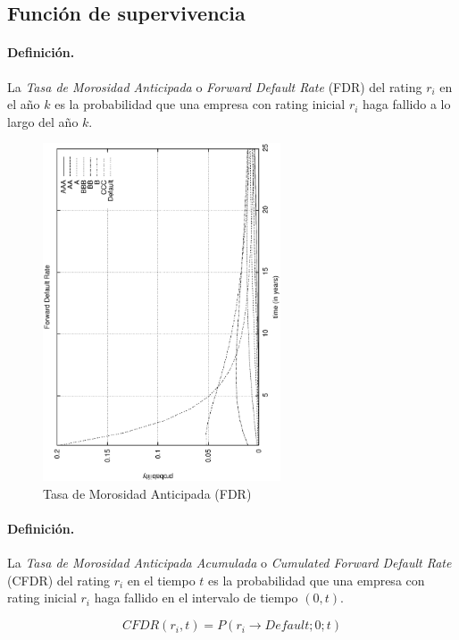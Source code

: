 \subsection{Funci\'on de supervivencia}
\label{mtrans:survival}

\paragraph{Definici\'on.} La \emph{Tasa de Morosidad Anticipada}
o \emph{Forward Default Rate}  (FDR) del rating $r_i$ en
el a\~no $k$ es la probabilidad que una empresa con rating inicial $r_i$ haga fallido
a lo largo del a\~no $k$.

\begin{figure}[!hb]
\begin{center}
\includegraphics[height=10cm, angle=-90]{./images/tma.ps}
\caption{Tasa de Morosidad Anticipada (FDR)}
\label{fdr}
\end{center}
\end{figure}

\paragraph{Definici\'on.} La \emph{Tasa de Morosidad Anticipada Acumulada}
o \emph{Cumulated Forward Default Rate} (CFDR)
del rating $r_i$ en el tiempo $t$ es la probabilidad que una empresa con rating inicial
$r_i$ haga fallido en el intervalo de tiempo $(0,t)$.

\begin{equation}
CFDR(r_i,t)=P(r_i \to Default;0;t)
\end{equation}

